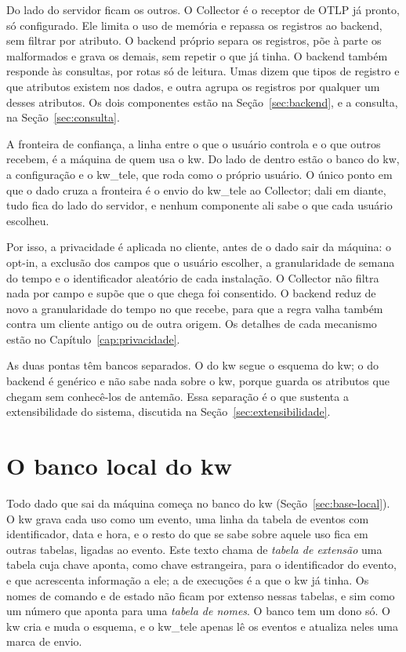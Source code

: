 Do lado do servidor ficam os outros. O Collector é o receptor de OTLP já
pronto, só configurado. Ele limita o uso de memória e repassa os registros ao
backend, sem filtrar por atributo. O backend próprio separa os registros, põe à
parte os malformados e grava os demais, sem repetir o que já tinha. O backend
também responde às consultas, por rotas só de leitura. Umas dizem que tipos de
registro e que atributos existem nos dados, e outra agrupa os registros por
qualquer um desses atributos. Os dois componentes estão na
Seção~\ref{sec:backend}, e a consulta, na Seção~\ref{sec:consulta}.

A fronteira de confiança, a linha entre o que o usuário controla e o que
outros recebem, é a máquina de quem usa o kw. Do lado de dentro estão o banco
do kw, a configuração e o kw\_tele, que roda como o próprio usuário. O único
ponto em que o dado cruza a fronteira é o envio do kw\_tele ao Collector; dali em diante, tudo fica do lado do servidor, e nenhum componente ali sabe o
que cada usuário escolheu.

Por isso, a privacidade é aplicada no cliente, antes de o dado sair da
máquina: o opt-in, a exclusão dos campos que o usuário escolher, a granularidade
de semana do tempo e o identificador aleatório de cada instalação. O Collector
não filtra nada por campo e supõe que o que chega foi consentido. O backend
reduz de novo a granularidade do tempo no que recebe, para que a regra valha
também contra um cliente antigo ou de outra origem. Os detalhes de cada
mecanismo estão no Capítulo~\ref{cap:privacidade}.

As duas pontas têm bancos separados. O do kw segue o esquema do kw; o do
backend é genérico e não sabe nada sobre o kw, porque guarda os atributos que
chegam sem conhecê-los de antemão. Essa separação é o que sustenta a
extensibilidade do sistema, discutida na Seção~\ref{sec:extensibilidade}.

\section{O banco local do kw}
\label{sec:banco-local}

Todo dado que sai da máquina começa no banco do kw
(Seção~\ref{sec:base-local}). O kw grava cada uso como um evento, uma linha
da tabela de eventos com identificador, data e hora, e o resto do que se sabe
sobre aquele uso fica em outras tabelas, ligadas ao evento. Este texto chama
de \emph{tabela de extensão} uma tabela cuja chave aponta, como chave
estrangeira, para o identificador do evento, e que acrescenta informação a
ele; a de execuções é a que o kw já tinha. Os nomes de comando e de estado não
ficam por extenso nessas tabelas, e sim como um número que aponta para uma
\emph{tabela de nomes}. O banco tem um dono só. O kw cria e muda o esquema, e
o kw\_tele apenas lê os eventos e atualiza neles uma marca de envio.


